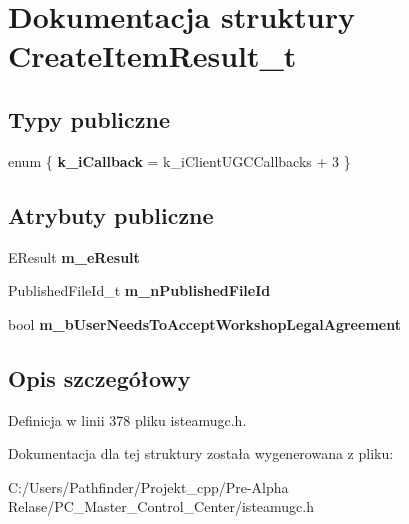 \hypertarget{struct_create_item_result__t}{}\section{Dokumentacja struktury Create\+Item\+Result\+\_\+t}
\label{struct_create_item_result__t}
\subsection*{Typy publiczne}
\begin{DoxyCompactItemize}
\item 
\mbox{\label{struct_create_item_result__t_a491c95efa1b09116ebc5063192007aeb}} 
enum \{ {\bfseries k\+\_\+i\+Callback} = k\+\_\+i\+Client\+U\+G\+C\+Callbacks + 3
 \}
\end{DoxyCompactItemize}
\subsection*{Atrybuty publiczne}
\begin{DoxyCompactItemize}
\item 
\mbox{\label{struct_create_item_result__t_aac8b851d7881c0df30b2b7dedf80ed6b}} 
E\+Result {\bfseries m\+\_\+e\+Result}
\item 
\mbox{\label{struct_create_item_result__t_adfb9da81546dd258d63243a61f11e62e}} 
Published\+File\+Id\+\_\+t {\bfseries m\+\_\+n\+Published\+File\+Id}
\item 
\mbox{\label{struct_create_item_result__t_a200b936a3a485cc3aee43218496d8115}} 
bool {\bfseries m\+\_\+b\+User\+Needs\+To\+Accept\+Workshop\+Legal\+Agreement}
\end{DoxyCompactItemize}


\subsection{Opis szczegółowy}


Definicja w linii 378 pliku isteamugc.\+h.



Dokumentacja dla tej struktury została wygenerowana z pliku\+:\begin{DoxyCompactItemize}
\item 
C\+:/\+Users/\+Pathfinder/\+Projekt\+\_\+cpp/\+Pre-\/\+Alpha Relase/\+P\+C\+\_\+\+Master\+\_\+\+Control\+\_\+\+Center/isteamugc.\+h\end{DoxyCompactItemize}
